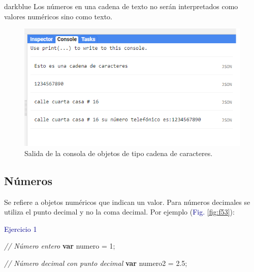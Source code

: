 \documentclass[
  12pt,
  letterpaper,
  twoside]{book}
\newenvironment{Shaded}{\begin{snugshade}}{\end{snugshade}}
\newcommand{\CommentTok}[1]{\textcolor[rgb]{0.24,0.58,0.00}{\textit{#1}}}
\newcommand{\DecValTok}[1]{\textcolor[rgb]{0.28,0.53,0.93}{#1}}
\newcommand{\FloatTok}[1]{\textcolor[rgb]{0.28,0.53,0.93}{#1}}
\newcommand{\KeywordTok}[1]{\textcolor[rgb]{0.00,0.00,0.00}{\textbf{#1}}}
\newcommand{\NormalTok}[1]{#1}
\newcommand{\OperatorTok}[1]{\textcolor[rgb]{0.00,0.00,0.00}{#1}}
\begin{document}
\begin{bluebox2}

\begin{awesomeblock}{5pt}{\faLightbulb}{darkblue}
Los números en una cadena de texto no serán interpretados como valores numéricos sino como texto.

\end{awesomeblock}

\end{bluebox2}

\begin{figure}[H]

{\centering \includegraphics[width=0.95\linewidth]{Img/ej0} 

}

\caption{Salida de la consola de objetos de tipo cadena de caracteres.}\label{fig:f52}
\end{figure}

\hypertarget{nuxfameros}{%
\subsection*{Números}\label{nuxfameros}}

Se refiere a objetos numéricos que indican un valor. Para números decimales se utiliza el punto decimal y no la coma decimal. Por ejemplo (\textcolor{darkblue}{Fig.} \ref{fig:f53}):

\textcolor{darkblue}{Ejercicio 1}

\begin{Shaded}
\begin{Highlighting}[]
\CommentTok{// Número entero}
\KeywordTok{var}\NormalTok{ numero }\OperatorTok{=} \DecValTok{1}\OperatorTok{;} 
 
\CommentTok{// Número decimal con punto decimal  }
\KeywordTok{var}\NormalTok{ numero2 }\OperatorTok{=} \FloatTok{2.5}\OperatorTok{;}  
\end{Highlighting}
\end{Shaded}
\end{document}
